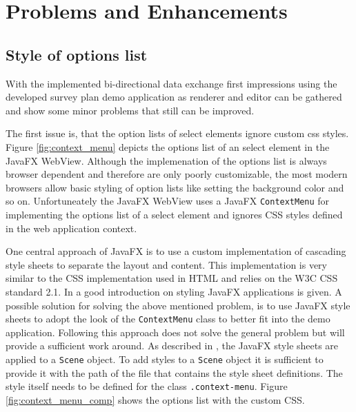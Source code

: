 \section{Problems and Enhancements}

\subsection{Style of options list}

With the implemented bi-directional data exchange first impressions using the developed survey plan demo application as renderer and editor can be gathered and show some minor problems that still can be improved.

The first issue is, that the option lists of select elements ignore custom css styles. Figure \ref{fig:context_menu} depicts the options list of an select element in the JavaFX WebView. Although the implemenation of the options list is always browser dependent and therefore are only poorly customizable, the most modern browsers allow basic styling of option lists like setting the background color and so on. Unfortuneately the JavaFX WebView uses a JavaFX \texttt{ContextMenu} for implementing the options list of a select element and ignores CSS styles defined in the web application context. 

One central approach of JavaFX is to use a custom implementation of cascading style sheets to separate the layout and content. This implementation is very similar to the CSS implementation used in HTML and relies on the W3C CSS standard 2.1. In \autocite{impl:skinning-fx} a good introduction on styling JavaFX applications is given. A possible solution for solving the above mentioned problem, is to use JavaFX style sheets to adopt the look of the \texttt{ContextMenu} class to better fit into the demo application. Following this approach does not solve the general problem but will provide a sufficient work around. As described in \autocite{impl:skinning-fx}, the JavaFX style sheets are applied to a \texttt{Scene} object. To add styles to a \texttt{Scene} object it is sufficient to provide it with the path of the file that contains the style sheet definitions. The style itself needs to be defined for the class \texttt{.context-menu}. Figure \ref{fig:context_menu_comp} shows the options list with the custom CSS.

